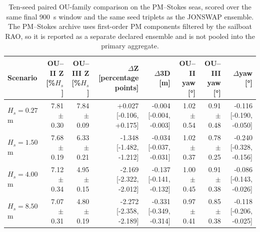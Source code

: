 \begin{table}[t]
  \centering
  \caption{Ten-seed paired OU-family comparison on the PM--Stokes seas, scored over the same final \SI{900}{s} window and the same seed triplets as the JONSWAP ensemble. The PM--Stokes archive uses first-order PM components filtered by the sailboat RAO, so it is reported as a separate declared ensemble and is not pooled into the primary aggregate.}
  \label{tab:ou_mc_pmstokes}
  \footnotesize
  \setlength{\tabcolsep}{4.0pt}
  \begin{tabular}{@{}lrrrrrrr@{}}
    \toprule
    Scenario & OU--II Z [\%$H_s$] & OU--III Z [\%$H_s$] & $\Delta$Z [percentage points] & $\Delta$3D [m] & OU--II yaw [\si{\degree}] & OU--III yaw [\si{\degree}] & $\Delta$yaw [\si{\degree}] \\
    \midrule
    $H_s=0.27$ m & 7.81 $\pm$ 0.30 & 7.84 $\pm$ 0.09 & +0.027 [-0.106, +0.175] & -0.004 [-0.004, -0.003] & 1.02 $\pm$ 0.54 & 0.91 $\pm$ 0.48 & -0.116 [-0.190, -0.050] \\
    $H_s=1.50$ m & 7.68 $\pm$ 0.19 & 6.33 $\pm$ 0.21 & -1.348 [-1.482, -1.212] & -0.034 [-0.037, -0.031] & 1.02 $\pm$ 0.37 & 0.78 $\pm$ 0.25 & -0.240 [-0.328, -0.156] \\
    $H_s=4.00$ m & 7.12 $\pm$ 0.34 & 4.95 $\pm$ 0.15 & -2.169 [-2.322, -2.012] & -0.137 [-0.141, -0.132] & 1.00 $\pm$ 0.45 & 0.91 $\pm$ 0.38 & -0.086 [-0.143, -0.026] \\
    $H_s=8.50$ m & 7.07 $\pm$ 0.31 & 4.80 $\pm$ 0.19 & -2.272 [-2.358, -2.189] & -0.331 [-0.349, -0.314] & 0.97 $\pm$ 0.41 & 0.85 $\pm$ 0.38 & -0.118 [-0.206, -0.025] \\
    \bottomrule
  \end{tabular}
\end{table}


